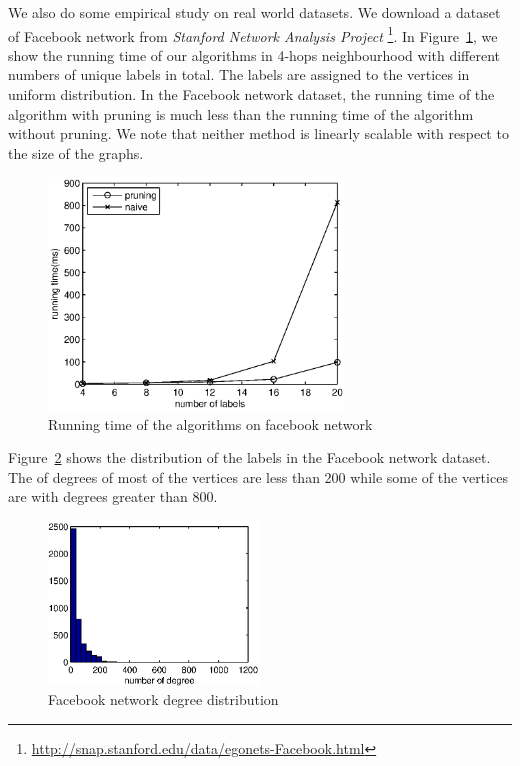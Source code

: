 We also do some empirical study on real world datasets. We download a dataset of Facebook network from \emph{Stanford Network Analysis Project} \footnote{\url{http://snap.stanford.edu/data/egonets-Facebook.html}}. In Figure~\ref{fig:exp:fb}, we show the running time of our algorithms in 4-hops neighbourhood with different numbers of unique labels in total. The labels are assigned to the vertices in uniform distribution. In the Facebook network dataset, the running time of the algorithm with pruning is much less than the running time of the algorithm without pruning. We note that neither method is linearly scalable with respect to the size of the graphs. 

\begin{figure}[h]
    \centering
      \includegraphics[width=0.7\textwidth]{figs/FB}
    \caption{Running time of the algorithms on facebook network}
    \label{fig:exp:fb}
\end{figure}

Figure~\ref{fig:exp:fb_dis} shows the distribution of the labels in the Facebook network dataset. The of degrees of most of the vertices are less than 200 while some of the vertices are with degrees greater than 800.

\begin{figure}[H]
    \centering
      \includegraphics[width=0.5\textwidth]{figs/fb_distri}
    \caption{Facebook network degree distribution}
    \label{fig:exp:fb_dis}
\end{figure}

